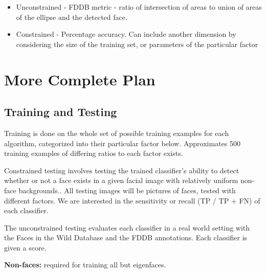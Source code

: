 \documentclass[11pt]{article} %
\theoremstyle{plain}
\theoremstyle{definition}
\theoremstyle{remark}
\numberwithin{equation}{section} %
\numberwithin{figure}{section} %
\numberwithin{table}{section} %
\begin{document}
\begin{itemize}
  \item Unconstrained - FDDB metric - ratio of intersection of areas to union of areas of the ellipse and the detected face.
  \item Constrained - Percentage accuracy. Can include another dimension by considering the size of the training set, or parameters of the particular factor
\end{itemize}

\clearpage
\section{More Complete Plan}

\subsection{Training and Testing}
Training is done on the whole set of possible training examples for each algorithm, categorized into their particular factor below. Approximates 500 training examples of differing ratios to each factor exists.

Constrained testing involves testing the trained classifier's ability to detect whether or not a face exists in a given facial image with relatively uniform non-face backgrounds.. All testing images will be pictures of faces, tested with different factors. We are interested in the sensitivity or recall (TP / TP + FN) of each classifier.

The unconstrained testing evaluates each classifier in a real world setting with the Faces in the Wild Database and the FDDB annotations. Each classifier is given a score.

\textbf{Non-faces:} required for training all but eigenfaces.
\end{document}
